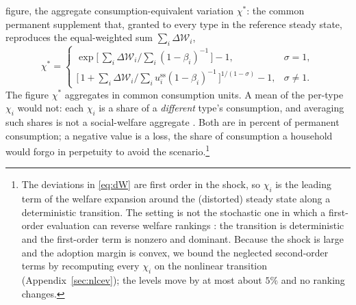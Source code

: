 figure, the aggregate consumption-equivalent variation $\chi^{\ast}$: the common
permanent supplement that, granted to every type in the reference steady state,
reproduces the equal-weighted sum $\sum_i\Delta\mathcal{W}_i$,
%
\begin{equation}
  \chi^{\ast}=
  \begin{cases}
    \exp\!\bigl[\,\textstyle\sum_i\Delta\mathcal{W}_i\big/\sum_i(1-\beta_i)^{-1}\,\bigr]-1, & \sigma=1,\\[4pt]
    \bigl[\,1+\textstyle\sum_i\Delta\mathcal{W}_i\big/\sum_i u^{\mathrm{ss}}_i(1-\beta_i)^{-1}\,\bigr]^{1/(1-\sigma)}-1, & \sigma\neq1.
  \end{cases}
  \label{eq:cev_star}
\end{equation}
%
The figure $\chi^{\ast}$ aggregates in common consumption units. A mean of the
per-type $\chi_i$ would not: each $\chi_i$ is a share of a \emph{different} type's
consumption, and averaging such shares is not a social-welfare aggregate
\citep{DavilaSchaab2025}. Both are in percent of permanent consumption; a negative
value is a loss, the share of consumption a household would forgo in perpetuity to
avoid the scenario.\footnote{The deviations in \eqref{eq:dW} are first order in the shock, so $\chi_i$ is the leading term of the welfare expansion around the (distorted) steady state along a deterministic transition. The setting is not the stochastic one in which a first-order evaluation can reverse welfare rankings \citep{KimKim2003,BenignoWoodford2005}: the transition is deterministic and the first-order term is nonzero and dominant. Because the shock is large and the adoption margin is convex, we bound the neglected second-order terms by recomputing every $\chi_i$ on the nonlinear transition (Appendix~\ref{sec:nlcev}); the levels move by at most about $5\%$ and no ranking changes.}

